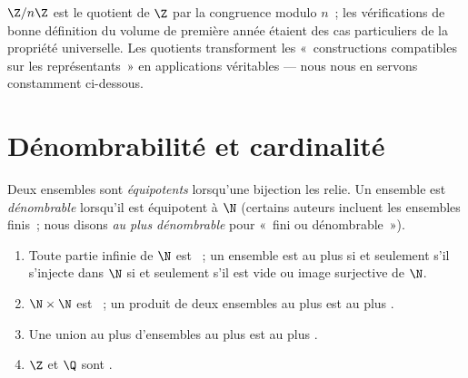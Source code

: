 \begin{example}
$\Z/n\Z$ est le quotient de $\Z$ par la congruence modulo $n$~; les
vérifications de bonne définition du volume de première année étaient
des cas particuliers de la propriété universelle. Les quotients
transforment les «~constructions compatibles sur les représentants~»
en applications véritables --- nous nous en servons constamment
ci-dessous.
\end{example}

\section{Dénombrabilité et cardinalité}

\begin{definition}\label{def:b2:structures:countable}
Deux ensembles sont \emph{équipotents} lorsqu'une
bijection les relie. Un ensemble est \emph{dénombrable} lorsqu'il est équipotent à $\N$ (certains auteurs incluent
les ensembles finis~; nous disons \emph{au plus dénombrable} pour
«~fini ou dénombrable~»).
\end{definition}

\begin{proposition}\label{prop:b2:structures:countablestable}
\begin{enumerate}
  \item Toute partie infinie de $\N$ est ~; un ensemble est
        au plus  si et seulement s'il s'injecte dans $\N$ si
        et seulement s'il est vide ou image surjective de $\N$.
  \item $\N \times \N$ est ~; un produit de deux ensembles
        au plus  est au plus .
  \item Une union au plus  d'ensembles au plus 
        est au plus .
  \item $\Z$ et $\Q$ sont .
\end{enumerate}
\end{proposition}

